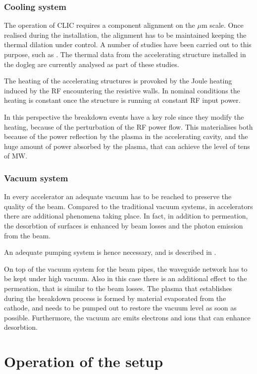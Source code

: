 \subsubsection{Cooling system}

The operation of CLIC requires a component alignment on the $\mu$m scale. Once realised during the installation, the alignment has to be maintained keeping the thermal dilation under control. A number of studies have been carried out to this purpose, such as \cite{Daskalaki:2141828}. The thermal data from the accelerating structure installed in the dogleg are currently analysed as part of these studies.

The heating of the accelerating structures is provoked by the Joule heating induced by the RF encountering the resistive walls. In nominal conditions the heating is constant once the structure is running at constant RF input power. 

In this perspective the breakdown events have a key role since they modify the heating, because of the perturbation of the RF power flow. This materialises both because of the power reflection by the plasma in the accelerating cavity, and the huge amount of power absorbed by the plasma, that can achieve the level of tens of MW.


\subsubsection{Vacuum system}

In every accelerator an adequate vacuum has to be reached to preserve the quality of the beam. Compared to the traditional vacuum systems, in accelerators there are additional phenomena taking place. In fact, in addition to permeation, the desorbtion of surfaces is enhanced by beam losses and the photon emission from the beam. 

An adequate pumping system is hence necessary, and is described in \cite{ctf3:dr}.

On top of the vacuum system for the beam pipes, the waveguide network has to be kept under high vacuum. Also in this case there is an additional effect to the permeation, that is similar to the beam losses. The plasma that establishes during the breakdown process is formed by material evaporated from the cathode, and needs to be pumped out to restore the vacuum level as soon as possible. Furthermore, the vacuum arc emits electrons and ions that can enhance desorbtion.


\section[Operation of the setup]{Operation of the setup}

